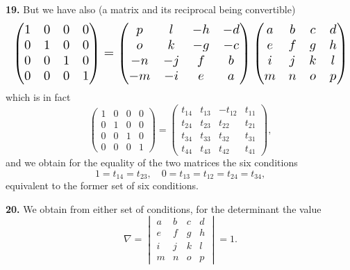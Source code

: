 \documentclass[11pt]{article}
\begin{document}
\textbf{19.} But we have also (a matrix and its reciprocal being convertible)
\[
\resizebox{\textwidth}{!}{$\displaystyle
\begin{pmatrix} 1 & 0 & 0 & 0 \\ 0 & 1 & 0 & 0 \\ 0 & 0 & 1 & 0 \\ 0 & 0 & 0 & 1 \end{pmatrix}
= \begin{pmatrix} p & l & -h & -d \\ o & k & -g & -c \\ -n & -j & f & b \\ -m & -i & e & a \end{pmatrix} \begin{pmatrix} a & b & c & d \\ e & f & g & h \\ i & j & k & l \\ m & n & o & p \end{pmatrix}
$}
\]
which is in fact
\[
\begin{pmatrix} 1 & 0 & 0 & 0 \\ 0 & 1 & 0 & 0 \\ 0 & 0 & 1 & 0 \\ 0 & 0 & 0 & 1 \end{pmatrix}
= \begin{pmatrix} t_{14} & t_{13} & -t_{12} & t_{11} \\ t_{24} & t_{23} & t_{22} & t_{21} \\ t_{34} & t_{33} & t_{32} & t_{31} \\ t_{44} & t_{43} & t_{42} & t_{41} \end{pmatrix},
\]
and we obtain for the equality of the two matrices the six conditions
\[
1 = t_{14} = t_{23},\quad 0 = t_{13} = t_{12} = t_{24} = t_{34},
\]
equivalent to the former set of six conditions.

\textbf{20.} We obtain from either set of conditions, for the determinant the value
\[
\nabla = \begin{vmatrix} a & b & c & d \\ e & f & g & h \\ i & j & k & l \\ m & n & o & p \end{vmatrix} = 1.
\]
\end{document}
